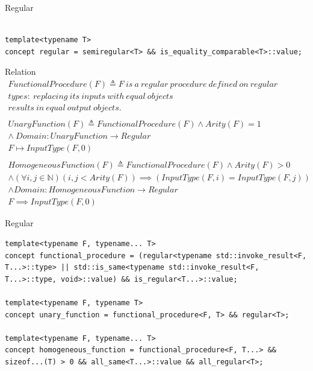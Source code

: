 \documentclass[10pt]{beamer}
\begin{document}
\begin{frame}[fragile]{Regular}
\begin{lstlisting}[style=cpp]

template<typename T>
concept regular = semiregular<T> && is_equality_comparable<T>::value;

\end{lstlisting}
\end{frame}

\begin{frame}{Relation}
    \begin{align*}
        FunctionalProcedure(F) \triangleq F~is~a~regular~procedure~defined~on~regular~&\\
        types:~replacing~its~inputs~with~equal~objects~\\
        results~in~equal~output~objects. \\\\
        UnaryFunction(F) \triangleq FunctionalProcedure(F) \land Arity(F) = 1 &\\
                \land~Domain: UnaryFunction \rightarrow Regular &\\
                F \mapsto InputType(F, 0)\\\\
        HomogeneousFunction(F) \triangleq FunctionalProcedure(F) \land Arity(F) > 0\\
        \land (\forall i,j \in \mathbb{N})(i,j < Arity(F)) \implies (InputType(F, i) = InputType(F, j))\\
        \land Domain: HomogeneousFunction \rightarrow Regular\\
        F \implies InputType(F, 0)
    \end{align*}
\end{frame}



\begin{frame}[fragile]{Regular}
\begin{lstlisting}[style=cpp]
template<typename F, typename... T>
concept functional_procedure = (regular<typename std::invoke_result<F, T...>::type> || std::is_same<typename std::invoke_result<F, T...>::type, void>::value) && is_regular<T...>::value;

template<typename F, typename T>
concept unary_function = functional_procedure<F, T> && regular<T>;

template<typename F, typename... T>
concept homogeneous_function = functional_procedure<F, T...> && sizeof...(T) > 0 && all_same<T...>::value && all_regular<T>;

\end{lstlisting}
\end{frame}
\end{document}
